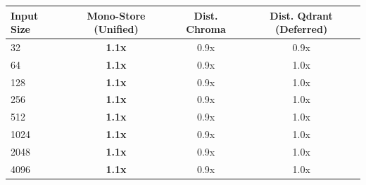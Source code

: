 \begin{tabular}{lccc}
\toprule
\textbf{Input Size} & \textbf{Mono-Store (Unified)} & \textbf{Dist. Chroma} & \textbf{Dist. Qdrant (Deferred)} \\
\midrule
32 & \textbf{1.1x} & 0.9x & 0.9x \\
64 & \textbf{1.1x} & 0.9x & 1.0x \\
128 & \textbf{1.1x} & 0.9x & 1.0x \\
256 & \textbf{1.1x} & 0.9x & 1.0x \\
512 & \textbf{1.1x} & 0.9x & 1.0x \\
1024 & \textbf{1.1x} & 0.9x & 1.0x \\
2048 & \textbf{1.1x} & 0.9x & 1.0x \\
4096 & \textbf{1.1x} & 0.9x & 1.0x \\
\bottomrule
\end{tabular}
